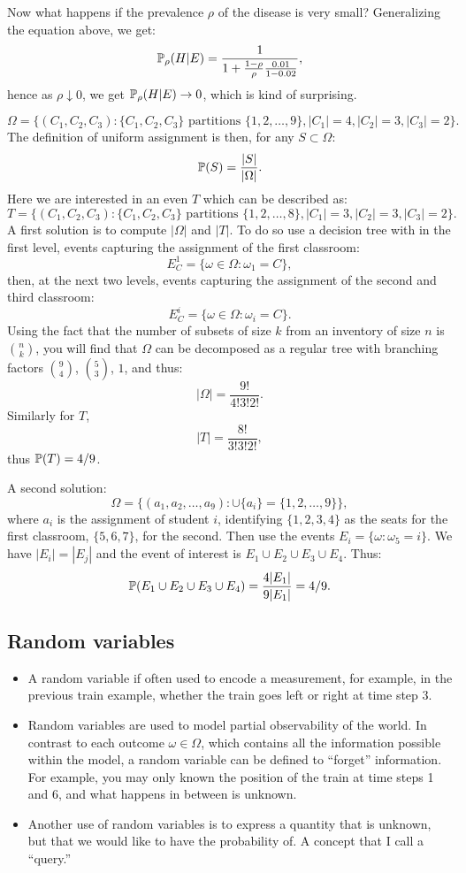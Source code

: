 \documentclass{article}
\begin{document}
Now what happens if the prevalence $\rho$ of the disease is very small? Generalizing the equation above, we get:
\[ \P_\rho(H|E) = \frac{1}{1 + \frac{1-\rho}{\rho}\frac{0.01}{1 - 0.02}}, \]
hence as $\rho \downarrow 0$, we get $\P_\rho(H|E) \to 0$, which is kind of surprising.

\[ \Omega = \{(C_1, C_2, C_3):\{C_1, C_2, C_3\} \text{ partitions }\{1, 2, \dots, 9\}, |C_1| = 4, |C_2| = 3, |C_3| = 2\}. \]
The definition of uniform assignment is then, for any $S \subset \Omega$:
\[ \P(S) = \frac{|S|}{|\Omega|}. \]
Here we are interested in an even $T$ which can be described as:
\[ T = \{(C_1, C_2, C_3):\{C_1, C_2, C_3\} \text{ partitions }\{1, 2, \dots, 8\}, |C_1| = 3, |C_2| = 3, |C_3| = 2\}.  \]
A first solution is to compute $|\Omega|$ and $|T|$. 
To do so use a decision tree with in the first level, events capturing the assignment of the first classroom:
\[ E^1_C = \{\omega \in \Omega : \omega_1 = C\}, \]
then, at the next two levels, events capturing the assignment of the second and third classroom:
\[ E^i_C = \{\omega \in \Omega : \omega_i = C\}. \]
Using the fact that the number of subsets of size $k$ from an inventory of size $n$ is $\binom{n}{k}$, you will find that $\Omega$ can be decomposed as a regular tree with branching factors $\binom{9}{4}$, $\binom{5}{3}$, $1$, and thus:
\[ |\Omega| = \frac{9!}{4! 3! 2!}. \]
Similarly for $T$, 
\[ |T| = \frac{8!}{3! 3! 2!}, \]
thus $\P(T) = 4/9$.

A second solution:
\[ \Omega = \{(a_1, a_2, \dots, a_9) : \cup \{a_i\} = \{1, 2, \dots, 9\}\}, \]
where $a_i$ is the assignment of student $i$, identifying $\{1, 2, 3, 4\}$ as the seats for the first classroom, $\{5, 6, 7\}$, for the second. Then use the events $E_i = \{\omega : \omega_5 = i\}$. We have $|E_i| = |E_j|$ and the event of interest is $E_1 \cup E_2 \cup E_3 \cup E_4$. Thus:
\[ \P(E_1 \cup E_2 \cup E_3 \cup E_4) = \frac{4 |E_1|}{9 |E_1|} = 4/9. \]


\subsection{Random variables}

\begin{itemize}
  \item A random variable if often used to encode a measurement, for example, in the previous train example, whether the train goes left or right at time step 3.
  \item Random variables are used to model partial observability of the world. In contrast to each outcome $\omega \in \Omega$, which contains all the information possible within the model, a random variable can be defined to ``forget'' information. For example, you may only known the position of the train at time steps 1 and 6, and what happens in between is unknown.
  \item Another use of random variables is to express a quantity that is unknown, but that we would like to have the probability of. A concept that I call a ``query.''
\end{itemize}
\end{document}
